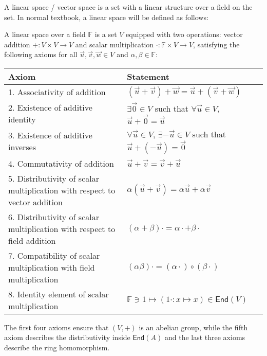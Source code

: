 \documentclass[
	11pt, %
	fleqn, %
	a4paper, %
]{LegrandOrangeBook}
\newcommand{\End}[1]{\mathsf{End}(#1)} %
\newcommand{\F}{\mathbb{F}} %
\begin{document}
A linear space / vector space is a set with a linear structure over a field on the set. In normal textbook, a linear space will be defined as follows:

\begin{corollary}
    A linear space over a field $\F$ is a set $V$ equipped with two operations: vector addition $+: V \times V \to V$ and scalar multiplication $\cdot : \F \times V \to V$, satisfying the following axioms for all $\vec{u}, \vec{v}, \vec{w} \in V$ and $\alpha, \beta \in \F$:
    \begin{center}
        \begin{tabularx}{\textwidth}{XX}
            \toprule
            \textbf{Axiom} & \textbf{Statement} \\
            \midrule
            1. Associativity of addition & $(\vec{u} + \vec{v}) + \vec{w} = \vec{u} + (\vec{v} + \vec{w})$ \\
            2. Existence of additive identity & $\exists \vec{0} \in V$ such that $\forall \vec{u} \in V$, $\vec{u} + \vec{0} = \vec{u}$ \\
            3. Existence of additive inverses & $\forall \vec{u} \in V$, $\exists -\vec{u} \in V$ such that $\vec{u} + (-\vec{u}) = \vec{0}$ \\
            4. Commutativity of addition & $\vec{u} + \vec{v} = \vec{v} + \vec{u}$ \\
            5. Distributivity of scalar multiplication with respect to vector addition & $\alpha (\vec{u} + \vec{v}) = \alpha \vec{u} + \alpha \vec{v}$ \\
            6. Distributivity of scalar multiplication with respect to field addition & $(\alpha + \beta) \cdot = \alpha \cdot + \beta \cdot$ \\
            7. Compatibility of scalar multiplication with field multiplication & $(\alpha \beta) \cdot = (\alpha \cdot) \circ (\beta \cdot)$ \\
            8. Identity element of scalar multiplication & $\F \ni 1 \mapsto (1\cdot : x \mapsto x) \in \End{V}$ \\
            \bottomrule
        \end{tabularx}
    \end{center}
\end{corollary}
\begin{remark}
    The first four axioms ensure that $(V, +)$ is an abelian group, while the fifth axiom describes the distributivity inside $\End{A}$ and the last three axioms describe the ring homomorphism.
\end{remark}
\end{document}
